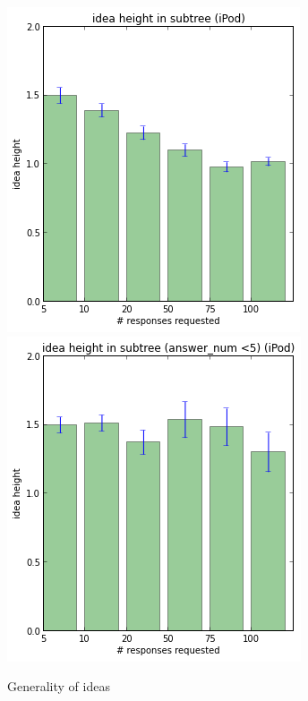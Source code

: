 \begin{figure}[h]
    \centering
    \includegraphics[width=0.9\columnwidth]{height_in_subtree}
    \includegraphics[width=0.9\columnwidth]{height_in_subtree_5}
    \caption{Generality of ideas}
\end{figure}


